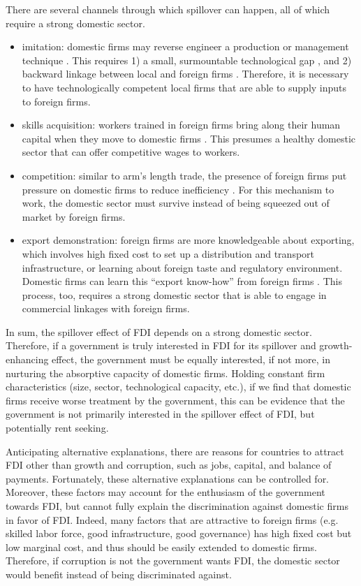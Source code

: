 There are several channels through which spillover can happen, all of which require a strong domestic sector.
\begin{itemize}
	\item imitation:  domestic firms may reverse engineer a production or management technique \citep{Wang1992}. This requires 1) a small, surmountable technological gap \citep{Kokko1996}, and 2) backward linkage between local and foreign firms \citep{Javorcik2004}. Therefore, it is necessary to have technologically competent local firms that are able to supply inputs to foreign firms.
	\item skills acquisition: workers trained in foreign firms bring along their human capital when they move to domestic firms \citep{Djankov2000}. This presumes a healthy domestic sector that can offer competitive wages to workers. 
	\item competition: similar to arm's length trade, the presence of foreign firms put pressure on domestic firms to reduce inefficiency \citep{Glass2002}. For this mechanism to work, the domestic sector must survive instead of being squeezed out of market by foreign firms.
	\item export demonstration: foreign firms are more knowledgeable about exporting, which involves high fixed cost to set up a distribution and transport infrastructure, or learning about foreign taste and regulatory environment. Domestic firms can learn this ``export know-how'' from foreign firms \citep{Aitken1997}. This process, too, requires a strong domestic sector that is able to engage in commercial linkages with foreign firms.
\end{itemize}

In sum, the spillover effect of FDI depends on a strong domestic sector. Therefore, if a government is truly interested in FDI for its spillover and growth-enhancing effect, the government must be equally interested, if not more, in nurturing the absorptive capacity of domestic firms. Holding constant firm characteristics (size, sector, technological capacity, etc.), if we find that domestic firms receive worse treatment by the government, this can be evidence that the government is not primarily interested in the spillover effect of FDI, but potentially rent seeking.

Anticipating alternative explanations, there are reasons for countries to attract FDI other than growth and corruption, such as jobs, capital, and balance of payments. Fortunately, these alternative explanations can be controlled for. Moreover, these factors may account for the enthusiasm of the government towards FDI, but cannot fully explain the discrimination against domestic firms in favor of FDI. Indeed, many factors that are attractive to foreign firms (e.g. skilled labor force, good infrastructure, good governance) has high fixed cost but low marginal cost, and thus should be easily extended to domestic firms. Therefore, if corruption is not the government wants FDI, the domestic sector would benefit instead of being discriminated against.

